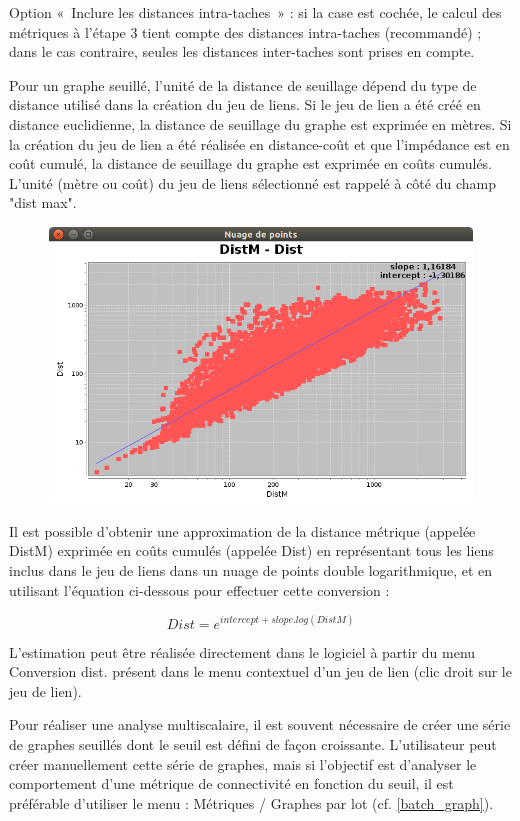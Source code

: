 \documentclass{article}
\begin{document}
Option «~Inclure les distances intra-taches~» : si la case est cochée, le calcul des métriques à l’étape 3 tient compte des distances intra-taches (recommandé) ; dans le cas contraire, seules les distances inter-taches sont prises en compte.

Pour un graphe seuillé, l’unité de la distance de seuillage dépend du type de distance utilisé dans la création du jeu de liens. Si le jeu de lien a été créé en distance euclidienne, la distance de seuillage du graphe est exprimée en mètres. Si la création du jeu de lien a été réalisée en distance-coût et que l'impédance est en coût cumulé, la distance de seuillage du graphe est exprimée en coûts cumulés. L'unité (mètre ou coût) du jeu de liens sélectionné est rappelé à côté du champ "dist max".

\begin{figure}[H]
	\includegraphics[scale=0.5]{img/manual-fr_img7.png} 
\end{figure}

Il est possible d’obtenir une approximation de la distance métrique (appelée DistM) exprimée en coûts cumulés (appelée Dist) en représentant tous les liens inclus dans le jeu de liens dans un nuage de points double logarithmique, et en utilisant l'équation ci-dessous pour effectuer cette conversion :

$$Dist = e^{intercept + slope . log(DistM)}$$

L'estimation peut être réalisée directement dans le logiciel à partir du menu Conversion dist. présent dans le menu contextuel d'un jeu de lien (clic droit sur le jeu de lien).

Pour réaliser une analyse multiscalaire, il est souvent nécessaire de créer une série de graphes seuillés dont le seuil est défini de façon croissante. L’utilisateur peut créer manuellement cette série de graphes, mais si l’objectif est d’analyser le comportement d’une métrique de connectivité en fonction du seuil, il est préférable d’utiliser le menu : Métriques / Graphes par lot (cf. \ref{batch_graph}).
\end{document}

